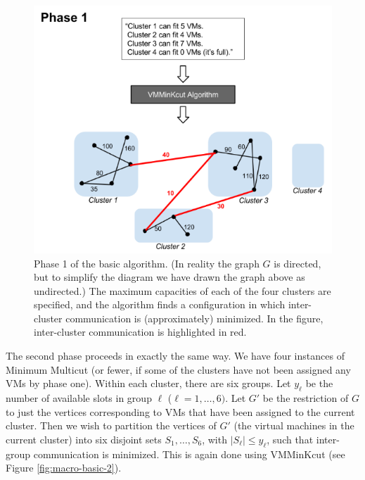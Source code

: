 \documentclass[11pt]{article}
\begin{document}
\begin{figure}
  \centering
\includegraphics[scale=0.7]{phase1.png}

 \caption{Phase 1 of the basic algorithm.  (In reality the graph $G$ is directed, but to simplify the diagram we have drawn the graph above as undirected.)  The maximum capacities of each of the four clusters are specified, and the algorithm finds a configuration in which inter-cluster communication is (approximately) minimized.  In the figure, inter-cluster communication is highlighted in red.}
 
 \label{fig:macro-basic-1}
\end{figure}

The second phase proceeds in exactly the same way.  We have four instances of Minimum Multicut (or fewer, if some of the clusters have not been assigned any VMs by phase one).  Within each cluster, there are six groups.  Let $y_\ell$ be the number of available slots in group $\ell$ ($\ell = 1,\ldots,6)$.  Let $G'$ be the restriction of $G$ to just the vertices corresponding to VMs that have been assigned to the current cluster.  Then we wish to partition the vertices of $G'$ (the virtual machines in the current cluster) into six disjoint sets $S_1, \ldots, S_6$, with $|S_\ell| \leq y_\ell$, such that inter-group communication is minimized.  This is again done using VMMinKcut (see Figure \ref{fig:macro-basic-2}).
\end{document}
